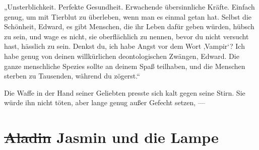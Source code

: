 „Unsterblichkeit. Perfekte Gesundheit. Erwachende übersinnliche Kräfte. Einfach genug, um mit Tierblut zu überleben, wenn man es einmal getan hat. Selbst die Schönheit, Edward, es gibt Menschen, die ihr Leben dafür geben würden, hübsch zu sein, und wage es nicht, sie oberflächlich zu nennen, bevor du nicht versucht hast, hässlich zu sein. Denkst du, ich habe Angst vor dem Wort ‚Vampir‘? Ich habe genug von deinen willkürlichen deontologischen Zwängen, Edward. Die ganze menschliche Spezies sollte an deinem Spaß teilhaben, und die Menschen sterben zu Tausenden, während du zögerst.“

Die Waffe in der Hand seiner Geliebten presste sich kalt gegen seine Stirn. Sie würde ihn nicht töten, aber lange genug außer Gefecht setzen, —

\section{\sout{Aladin} Jasmin und die Lampe}

